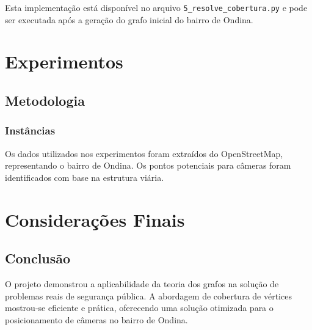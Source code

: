 \documentclass[12pt, a4paper]{report}
\begin{document}
Esta implementação está disponível no arquivo \texttt{5\_resolve\_cobertura.py} e pode ser executada após a geração do grafo inicial do bairro de Ondina.

\chapter{Experimentos}

\section{Metodologia}
\subsection{Instâncias}
Os dados utilizados nos experimentos foram extraídos do OpenStreetMap, representando o bairro de Ondina. Os pontos potenciais para câmeras foram identificados com base na estrutura viária.

\chapter{Considerações Finais}

\section{Conclusão}
O projeto demonstrou a aplicabilidade da teoria dos grafos na solução de problemas reais de segurança pública. A abordagem de cobertura de vértices mostrou-se eficiente e prática, oferecendo uma solução otimizada para o posicionamento de câmeras no bairro de Ondina.

\newpage
\renewcommand{\refname}{Referências Bibliográficas}

\nocite{*}
\end{document}
